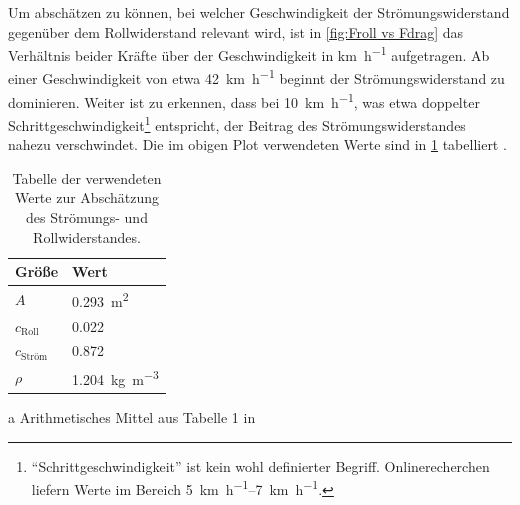 		Um abschätzen zu können, bei welcher Geschwindigkeit der Strömungswiderstand gegenüber dem Rollwiderstand relevant wird, ist in \cref{fig:Froll vs Fdrag} das Verhältnis beider Kräfte über der Geschwindigkeit in \unit{\kilo\metre\per\hour} aufgetragen.
		Ab einer Geschwindigkeit von etwa \qty{42}{\kilo\metre\per\hour} beginnt der Strömungswiderstand zu dominieren.
		Weiter ist zu erkennen, dass bei \qty{10}{\kilo\metre\per\hour}, was etwa doppelter Schrittgeschwindigkeit\footnote{\hspace{1mm} ``Schrittgeschwindigkeit'' ist kein wohl definierter Begriff. Onlinerecherchen liefern Werte im Bereich \qtyrange{5}{7}{\kilo\metre\per\hour}.} entspricht, der Beitrag des Strömungswiderstandes nahezu verschwindet.
		Die im obigen Plot verwendeten Werte sind in \cref{tab:drag roll values} tabelliert \cites{air.drag.human.body.VANINGENSCHENAU1982}{material.advances.skateboarding.WATERMAN1978}.
		\begin{table}[h]
			\caption[Tabelle der verwendeten Werte zur Abschätzung des Strömungs- und Rollwiderstandes]{Tabelle der verwendeten Werte zur Abschätzung des Strömungs- und Rollwiderstandes.}%
			\label{tab:drag roll values}
			\centering
			\begin{threeparttable}
				\begin{tabular}{ll}
					\toprule
					Größe\hspace{1cm}						& Wert\\ \midrule
					\(A\)\tnote{a}\hspace{1cm}				& \qty{0,293}{\metre\squared}\\
					\(c_\text{Roll}\)\hspace{1cm}			& \num{0,022}\\
					\(c_\text{Ström}\)\tnote{a}\hspace{1cm}	& \num{0,872}\\
					\(\rho\)\hspace{1cm}					& \qty{1,204}{\kilo\gram\per\metre\cubed}\\ \bottomrule
				\end{tabular}
				\begin{tablenotes}\footnotesize
					\item[a]	Arithmetisches Mittel aus Tabelle 1 in \cite{air.drag.human.body.VANINGENSCHENAU1982}
				\end{tablenotes}
			\end{threeparttable}
		\end{table}

